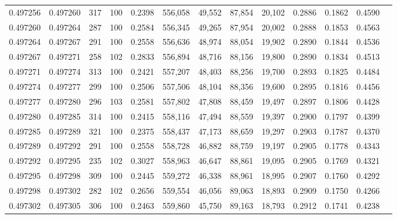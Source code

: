 \begin{tabular}{rrrrrrrrrrrrr}
0.497256 & 0.497260 &   317 & 100 &                                     0.2398 & 556,058 &  49,552 &  87,854 &  20,102 & 0.2886 & 0.1862 & 0.4590 \\
0.497260 & 0.497264 &   287 & 100 &                                     0.2584 & 556,345 &  49,265 &  87,954 &  20,002 & 0.2888 & 0.1853 & 0.4563 \\
0.497264 & 0.497267 &   291 & 100 &                                     0.2558 & 556,636 &  48,974 &  88,054 &  19,902 & 0.2890 & 0.1844 & 0.4536 \\
0.497267 & 0.497271 &   258 & 102 &                                     0.2833 & 556,894 &  48,716 &  88,156 &  19,800 & 0.2890 & 0.1834 & 0.4513 \\
0.497271 & 0.497274 &   313 & 100 &                                     0.2421 & 557,207 &  48,403 &  88,256 &  19,700 & 0.2893 & 0.1825 & 0.4484 \\
0.497274 & 0.497277 &   299 & 100 &                                     0.2506 & 557,506 &  48,104 &  88,356 &  19,600 & 0.2895 & 0.1816 & 0.4456 \\
0.497277 & 0.497280 &   296 & 103 &                                     0.2581 & 557,802 &  47,808 &  88,459 &  19,497 & 0.2897 & 0.1806 & 0.4428 \\
0.497280 & 0.497285 &   314 & 100 &                                     0.2415 & 558,116 &  47,494 &  88,559 &  19,397 & 0.2900 & 0.1797 & 0.4399 \\
0.497285 & 0.497289 &   321 & 100 &                                     0.2375 & 558,437 &  47,173 &  88,659 &  19,297 & 0.2903 & 0.1787 & 0.4370 \\
0.497289 & 0.497292 &   291 & 100 &                                     0.2558 & 558,728 &  46,882 &  88,759 &  19,197 & 0.2905 & 0.1778 & 0.4343 \\
0.497292 & 0.497295 &   235 & 102 &                                     0.3027 & 558,963 &  46,647 &  88,861 &  19,095 & 0.2905 & 0.1769 & 0.4321 \\
0.497295 & 0.497298 &   309 & 100 &                                     0.2445 & 559,272 &  46,338 &  88,961 &  18,995 & 0.2907 & 0.1760 & 0.4292 \\
0.497298 & 0.497302 &   282 & 102 &                                     0.2656 & 559,554 &  46,056 &  89,063 &  18,893 & 0.2909 & 0.1750 & 0.4266 \\
0.497302 & 0.497305 &   306 & 100 &                                     0.2463 & 559,860 &  45,750 &  89,163 &  18,793 & 0.2912 & 0.1741 & 0.4238 \\

\end{tabular}
